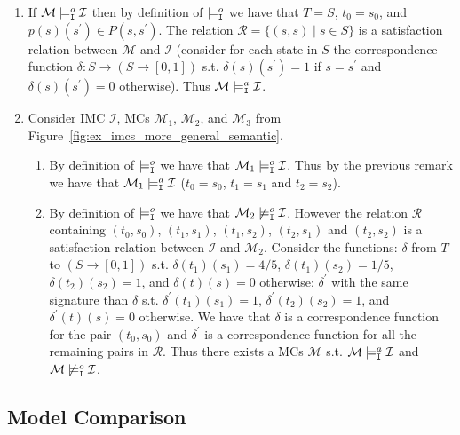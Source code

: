 \documentclass{llncs}
\newcommand{\mc}{\textnormal{MC}}
\newcommand{\imc}{\textnormal{IMC}}
\newcommand{\satisfactionImcOnce}{\ensuremath{\models^{o}_{\tt{I}}}}
\newcommand{\satisfactionImc}{\ensuremath{\models^{a}_{\tt{I}}}}
\begin{document}
\begin{enumerate}
	\item 
If $\mathcal{M} \satisfactionImcOnce \mathcal{I}$ then by definition of $\satisfactionImcOnce$ we have that $T = S$, $t_0 = s_0$, and $p(s)(s^\prime) \in P(s,s^\prime)$. The relation $\mathcal{R} = \{ (s,s) \mid s \in S\}$ is a satisfaction relation between $\mathcal{M}$ and $\mathcal{I}$ (consider for each state in $S$ the correspondence function $\delta : S \to (S \to [0,1])$ s.t. $\delta(s)(s^\prime) = 1$ if $s = s^\prime$ and $\delta(s)(s^\prime) = 0$ otherwise).
Thus $\mathcal{M} \satisfactionImc \mathcal{I}$.

	\item Consider {\imc} $\mathcal{I}$, {\mc}s $\mathcal{M}_1$, $\mathcal{M}_2$, and $\mathcal{M}_3$ from Figure~\ref{fig:ex_imcs_more_general_semantic}.
    \begin{enumerate}
    	\item By definition of $\satisfactionImcOnce$ we have that $\mathcal{M}_1 \satisfactionImcOnce \mathcal{I}$. Thus by the previous remark we have that 
        $\mathcal{M}_1 \satisfactionImc \mathcal{I}$ ($t_0 = s_0$, $t_1 = s_1$ and $t_2 = s_2$).
        
        \item By definition of $\satisfactionImcOnce$ we have that $\mathcal{M}_2 \not\satisfactionImcOnce \mathcal{I}$. However the relation $\mathcal{R}$ containing
        $(t_0,s_0)$, $(t_1,s_1)$, $(t_1,s_2)$, $(t_2,s_1)$ and $(t_2,s_2)$ is a satisfaction relation between $\mathcal{I}$ and $\mathcal{M}_2$. Consider the functions: $\delta$ from $T$ to $(S \to [0,1])$
        s.t. $\delta(t_1)(s_1) = 4/5$, $\delta(t_1)(s_2) = 1/5$, 
        $\delta(t_2)(s_2) = 1$, and $\delta(t)(s) = 0$ otherwise;
        $\delta^\prime$ with the same signature than $\delta$
        s.t. $\delta^\prime(t_1)(s_1) = 1$, $\delta^\prime(t_2)(s_2) = 1$, 
        and $\delta^\prime(t)(s) = 0$ otherwise.
        We have that $\delta$ is a correspondence function for the pair $(t_0,s_0)$
        and $\delta^\prime$ is a correspondence function for all the remaining pairs in $\mathcal{R}$.
	Thus there exists a {\mc}s $\mathcal{M}$ s.t. $\mathcal{M} \satisfactionImc \mathcal{I}$
    and $\mathcal{M} \not\satisfactionImcOnce \mathcal{I}$.
    \end{enumerate}    
\end{enumerate}


    \subsection{Model Comparison}\label{ap:model_comparison}
\end{document}
